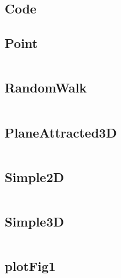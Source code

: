 \documentclass{article}
\begin{document}
\singlespace
\begin{appendices}
  \section{Code}
  \subsection{Point}
  \inputminted{java}{../src/Point.java}

  \subsection{RandomWalk}
  \inputminted{java}{../src/RandomWalk.java}

  \subsection{PlaneAttracted3D}
  \inputminted{java}{../src/PlaneAttracted3D.java}

  \subsection{Simple2D}
  \inputminted{java}{../src/Simple2D.java}
  
  \subsection{Simple3D}
  \inputminted{java}{../src/Simple3D.java}

  \subsection{plotFig1}
  \inputminted{python}{../src/plotFig1.py}
  
\end{appendices}
\end{document}
